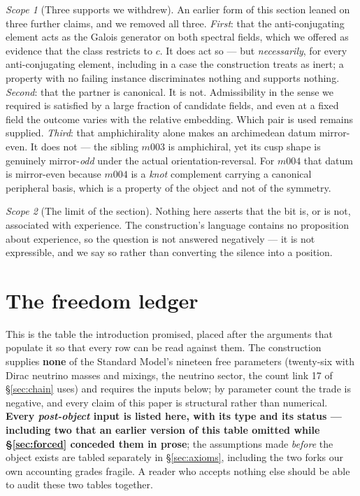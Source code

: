 \documentclass[11pt,a4paper]{article}
\theoremstyle{definition}
\theoremstyle{remark}
\newtheorem{scopenote}{Scope}
\begin{document}
\begin{scopenote}[Three supports we withdrew]
An earlier form of this section leaned on three further claims, and we removed all three. \emph{First}: that
the anti-conjugating element acts as the Galois generator on both spectral fields, which we offered as
evidence that the class restricts to $c$. It does act so --- but \emph{necessarily}, for every
anti-conjugating element, including in a case the construction treats as inert; a property with no
failing instance discriminates nothing and supports nothing. \emph{Second}: that the partner is
canonical. It is not. Admissibility in the sense we required is satisfied by a large fraction of
candidate fields, and even at a fixed field the outcome varies with the relative embedding. Which
pair is used remains supplied. \emph{Third}: that amphichirality alone makes an archimedean datum
mirror-even. It does not --- the sibling $m003$ is amphichiral, yet its cusp shape is genuinely
mirror-\emph{odd} under the actual orientation-reversal. For $m004$ that datum is mirror-even because
$m004$ is a \emph{knot} complement carrying a canonical peripheral basis, which is a property of the
object and not of the symmetry.
\end{scopenote}

\begin{scopenote}[The limit of the section]
Nothing here asserts that the bit is, or is not, associated with experience. The construction's
language contains no proposition about experience, so the question is not answered negatively --- it
is not expressible, and we say so rather than converting the silence into a position.
\end{scopenote}

\section{The freedom ledger}\label{sec:ledger}

This is the table the introduction promised, placed after the arguments that populate it so that every row can be read against
them. The construction supplies \textbf{none} of the Standard Model's nineteen free parameters (twenty-six with Dirac neutrino masses and mixings, the neutrino
sector, the count link 17 of \S\ref{sec:chain} uses) and requires the inputs below; by
parameter count the trade is negative, and every claim of this paper is structural rather than numerical. \textbf{Every
\emph{post-object} input is listed here, with its type and its status --- including two that an
earlier version of this table omitted while \S\ref{sec:forced} conceded them in prose}; the
assumptions made
\emph{before} the object exists are tabled separately in \S\ref{sec:axioms}, including the two forks
our own accounting grades fragile. A reader who accepts nothing else should be able to audit these
two tables together.
\end{document}
